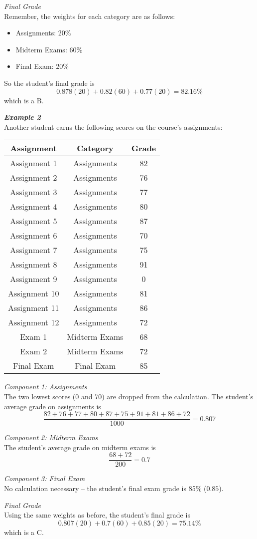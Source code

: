 \documentclass[12pt]{letter}
\newcommand{\?}{\stackrel{?}{=}}
\begin{document}
	\textit{Final Grade} \\
	Remember, the weights for each category are as follows: \begin{itemize}
		\item Assignments: 20\%
		\item Midterm Exams: 60\%
		\item Final Exam: 20\%
	\end{itemize}
	So the student's final grade is $$0.878(20) + 0.82(60) + 0.77(20) = 82.16\%$$ which is a B.
	
	\newpage
	
	\textbf{\textit{Example 2}} \\
	Another student earns the following scores on the course's assignments:
	
	\begin{tabular}{|c|c|c|} \hline
		\textbf{Assignment} & \textbf{Category} & \textbf{Grade} \\ \hline
		Assignment 1 & Assignments & 82 \\ \hline
		Assignment 2 & Assignments & 76 \\ \hline
		Assignment 3 & Assignments & 77 \\ \hline
		Assignment 4 & Assignments & 80 \\ \hline
		Assignment 5 & Assignments & 87 \\ \hline
		Assignment 6 & Assignments & 70 \\ \hline
		Assignment 7 & Assignments & 75 \\ \hline
		Assignment 8 & Assignments & 91 \\ \hline
		Assignment 9 & Assignments & 0 \\ \hline
		Assignment 10 & Assignments & 81 \\ \hline
		Assignment 11 & Assignments & 86 \\ \hline
		Assignment 12 & Assignments & 72 \\ \hline
		Exam 1 & Midterm Exams & 68 \\ \hline
		Exam 2 & Midterm Exams & 72 \\ \hline
		Final Exam & Final Exam & 85 \\ \hline
	\end{tabular}
	
	\textit{Component 1: Assignments} \\
	The two lowest scores (0 and 70) are dropped from the calculation. The student's average grade on assignments is $$\dfrac{82 + 76 + 77 + 80 + 87 + 75 + 91 + 81 + 86 + 72}{1000} = 0.807$$
	
	\textit{Component 2: Midterm Exams} \\
	The student's average grade on midterm exams is $$\dfrac{68 + 72}{200} = 0.7$$
	
	\textit{Component 3: Final Exam} \\
	No calculation necessary -- the student's final exam grade is 85\% ($0.85$).
	
	\textit{Final Grade} \\
	Using the same weights as before, the student's final grade is $$0.807(20) + 0.7(60) + 0.85(20) = 75.14\%$$ which is a C.
	
	\newpage
	
	
\end{document}
